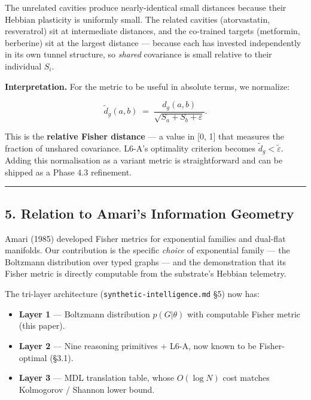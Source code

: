 \documentclass[
  11pt,
  a4paper,
]{article}
\providecommand{\tightlist}{%
  \setlength{\itemsep}{0pt}\setlength{\parskip}{0pt}}
\begin{document}
The unrelated cavities produce nearly-identical small distances because
their Hebbian plasticity is uniformly small. The related cavities
(atorvastatin, resveratrol) sit at intermediate distances, and the
co-trained targets (metformin, berberine) sit at the largest distance
--- because each has invested independently in its own tunnel structure,
so \emph{shared} covariance is small relative to their individual
\(S_i\).

\textbf{Interpretation.} For the metric to be useful in absolute terms,
we normalize:

\[
\tilde{d}_g(a, b) \;=\; \frac{d_g(a, b)}{\sqrt{S_a + S_b + \varepsilon}}.
\]

This is the \textbf{relative Fisher distance} --- a value in {[}0, 1{]}
that measures the fraction of unshared covariance. L6-A's optimality
criterion becomes \(\tilde{d}_g < \tilde{\varepsilon}\). Adding this
normalisation as a variant metric is straightforward and can be shipped
as a Phase 4.3 refinement.

\begin{center}\rule{0.5\linewidth}{0.5pt}\end{center}

\subsection{5. Relation to Amari's Information
Geometry}\label{relation-to-amaris-information-geometry}

Amari (1985) developed Fisher metrics for exponential families and
dual-flat manifolds. Our contribution is the specific \emph{choice} of
exponential family --- the Boltzmann distribution over typed graphs ---
and the demonstration that its Fisher metric is directly computable from
the substrate's Hebbian telemetry.

The tri-layer architecture (\texttt{synthetic-intelligence.md} §5) now
has:

\begin{itemize}
\tightlist
\item
  \textbf{Layer 1} --- Boltzmann distribution \(p(G|\theta)\) with
  computable Fisher metric (this paper).
\item
  \textbf{Layer 2} --- Nine reasoning primitives + L6-A, now known to be
  Fisher-optimal (§3.1).
\item
  \textbf{Layer 3} --- MDL translation table, whose \(O(\log N)\) cost
  matches Kolmogorov / Shannon lower bound.
\end{itemize}
\end{document}
